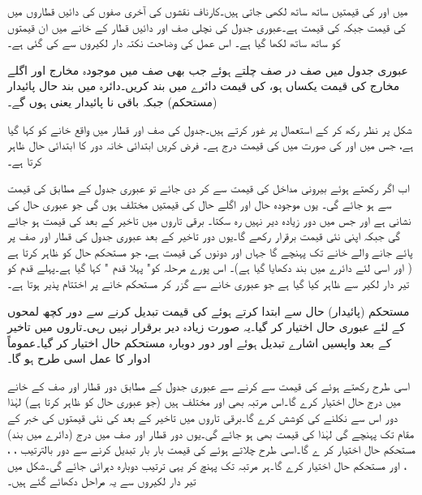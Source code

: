   میں      اور  کی قیمتیں  ساتھ ساتھ     لکھی جاتی ہیں۔کارناف نقشوں   کی آخری صفوں کی دائیں قطاروں  میں   کی قیمت   جبکہ   کی  قیمت   ہے۔عبوری جدول  کی نچلی صف  اور دائیں قطار  کے خانے میں ان قیمتوں کو ساتھ ساتھ   لکھا گیا ہے۔ اس عمل کی وضاحت نکتہ دار لکیروں سے  کی گئی ہے۔

عبوری جدول میں صف در صف چلتے ہوئے    جب  بھی     صف میں موجودہ مخارج  اور  اگلے مخارج  کی قیمت   یکساں ہو،  کی قیمت دائرے میں بند کریں۔دائرہ میں بند  حال    پائیدار   (مستحکم) جبکہ باقی نا پائیدار  یعنی    ہوں گے۔

شکل پر نظر رکھ  کر   کے استعمال پر غور کرتے ہیں۔جدول کی    صف  اور  قطار میں واقع خانے کو  کہا گیا ہے، جس میں  اور  کی صورت میں      کی قیمت  درج ہے۔ فرض  کریں ابتدائی خانہ دور کا ابتدائی حال ظاہر کرتا ہے۔

اب اگر   رکھتے ہوئے بیرونی مداخل  کی قیمت   سے    کر دی جائے تو عبوری جدول کے مطابق  کی قیمت  سے    ہو جائے گی۔ یوں   موجودہ حال  اور  اگلے حال   کی قیمتیں مختلف ہوں گی جو   عبوری  حال  کی نشانی ہے   اور جس میں دور   زیادہ دیر نہیں رہ سکتا۔ برقی تاروں میں تاخیر کے بعد   کی قیمت   ہو جائے گی جبکہ   اپنی نئی قیمت   برقرار رکھے گا۔یوں دور تاخیر کے بعد عبوری جدول کی   قطار اور   صف  پر پائے جانے والے خانے تک پہنچے گا جہاں  اور  دونوں کی قیمت  ہے، جو   مستحکم حال کو ظاہر کرتا ہے ( اور اسی لئے دائرے میں بند دکھایا گیا ہے)۔ اس پورے مرحلہ کو" پہلا قدم "  کہا گیا ہے۔پہلے قدم کو تیر  دار لکیر  سے ظاہر کیا گیا ہے جو عبوری خانے سے گزر کر مستحکم خانے پر  اختتام پذیر ہوتا ہے۔

   مستحکم (پائیدار) حال سے ابتدا کرتے ہوئے  کی قیمت تبدیل کرنے سے دور  کچھ لمحوں کے لئے  عبوری حال اختیار کر گیا۔یہ صورت زیادہ دیر برقرار نہیں رہی۔تاروں میں  تاخیر کے بعد  واپسیں اشارے تبدیل ہوئے اور دور دوبارہ  مستحکم حال اختیار کر گیا۔عموماً ادوار کا عمل اسی طرح ہو گا۔

اسی طرح   رکھتے ہوئے    کی قیمت  سے  کرنے سے  عبوری جدول کے مطابق دور   قطار اور   صف  کے خانے میں درج حال   اختیار کرے گا۔اس مرتبہ  بھی  اور  مختلف ہیں (جو عبوری حال کو ظاہر کرتا ہے)   لہٰذا دور اس سے نکلنے کی کوشش کرے گا۔برقی تاروں میں تاخیر کے بعد   کی  نئی قیمتوں  کی خبر   کے مقام تک پہنچے گی   لہٰذا  کی قیمت بھی   ہو جائے گی۔یوں دور  قطار اور   صف میں درج (دائرے میں بند)    مستحکم  حال  اختیار کر ے  گا۔اسی  طرح  چلاتے ہوئے  کی قیمت  بار بار تبدیل کرنے سے دور  بالترتیب  ، ،   ، اور  مستحکم حال اختیار کرے گا۔ہر مرتبہ  تک  پہنچ کر   یہی ترتیب  دوبارہ    دہرائی جائے گی۔شکل میں تیر  دار  لکیروں سے یہ مراحل دکھائے گئے ہیں۔


